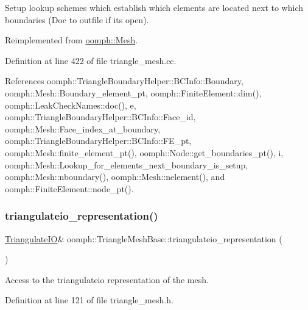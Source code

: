 Setup lookup schemes which establish which elements are located next to which boundaries (Doc to outfile if it\textquotesingle{}s open). 

Reimplemented from \hyperlink{classoomph_1_1Mesh_a413cbcbea4fb1111703da9ee97429640}{oomph\+::\+Mesh}.



Definition at line 422 of file triangle\+\_\+mesh.\+cc.



References oomph\+::\+Triangle\+Boundary\+Helper\+::\+B\+C\+Info\+::\+Boundary, oomph\+::\+Mesh\+::\+Boundary\+\_\+element\+\_\+pt, oomph\+::\+Finite\+Element\+::dim(), oomph\+::\+Leak\+Check\+Names\+::doc(), e, oomph\+::\+Triangle\+Boundary\+Helper\+::\+B\+C\+Info\+::\+Face\+\_\+id, oomph\+::\+Mesh\+::\+Face\+\_\+index\+\_\+at\+\_\+boundary, oomph\+::\+Triangle\+Boundary\+Helper\+::\+B\+C\+Info\+::\+F\+E\+\_\+pt, oomph\+::\+Mesh\+::finite\+\_\+element\+\_\+pt(), oomph\+::\+Node\+::get\+\_\+boundaries\+\_\+pt(), i, oomph\+::\+Mesh\+::\+Lookup\+\_\+for\+\_\+elements\+\_\+next\+\_\+boundary\+\_\+is\+\_\+setup, oomph\+::\+Mesh\+::nboundary(), oomph\+::\+Mesh\+::nelement(), and oomph\+::\+Finite\+Element\+::node\+\_\+pt().

\mbox{\label{classoomph_1_1TriangleMeshBase_a1cd134700f02b81239a7de630a496dcf}} 
\subsubsection{\texorpdfstring{triangulateio\+\_\+representation()}{triangulateio\_representation()}}
{\footnotesize\ttfamily \hyperlink{structoomph_1_1TriangulateIO}{Triangulate\+IO}\& oomph\+::\+Triangle\+Mesh\+Base\+::triangulateio\+\_\+representation (\begin{DoxyParamCaption}{ }\end{DoxyParamCaption})\hspace{0.3cm}{\ttfamily [inline]}}



Access to the triangulateio representation of the mesh. 



Definition at line 121 of file triangle\+\_\+mesh.\+h.



